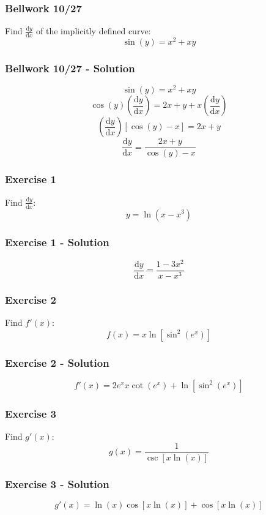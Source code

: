 \documentclass[12pt]{beamer}
\begin{document}
\begin{frame}
	\frametitle{Bellwork 10/27}
	\initclock

	\vfill
	\vfill
	\vfill
	\vfill
	\Large
	Find $\frac{\mathrm{d}y}{\mathrm{d}x}$ of the implicitly defined curve:
	\[\sin\left(y\right)=x^2+xy\]
	\vfill
	\vfill
	\vfill
	\vfill
	\vfill
	\vfill
	\vfill

	\small
	\crono
\end{frame}
\begin{frame}
	\frametitle{Bellwork 10/27 - Solution}

	\large
	\[\sin\left(y\right)=x^2+xy\]
	\[\cos(y)\left(\frac{\mathrm{d}y}{\mathrm{d}x}\right)=2x+y+x\left(\frac{\mathrm{d}y}{\mathrm{d}x}\right)\]
	\[\left(\frac{\mathrm{d}y}{\mathrm{d}x}\right)[\cos(y)-x]=2x+y\]
	\[\boxed{\frac{\mathrm{d}y}{\mathrm{d}x}=\frac{2x+y}{\cos(y)-x}}\]
\end{frame}
\begin{frame}
	\frametitle{Exercise 1}

	\Large
	Find $\frac{\mathrm{d}y}{\mathrm{d}x}$:
	\[y=\ln(x-x^3)\]
\end{frame}
\begin{frame}
	\frametitle{Exercise 1 - Solution}

	\Large
	\[\boxed{\frac{\mathrm{d}y}{\mathrm{d}x}=\frac{1-3x^2}{x-x^3}}\]
\end{frame}
\begin{frame}
	\frametitle{Exercise 2}

	\Large
	Find $f'(x)$:
	\[f(x)=x\ln\left[\sin^{2}\left(e^x\right)\right]\]
\end{frame}
\begin{frame}
	\frametitle{Exercise 2 - Solution}

	\Large
	\[\boxed{f'(x)=2e^xx\cot(e^x)+\ln[\sin^2(e^x)]}\]
\end{frame}
\begin{frame}
	\frametitle{Exercise 3}

	\Large
	Find $g'(x)$:
	\[g(x)=\frac{1}{\csc\left[x\ln\left(x\right)\right]}\]
\end{frame}
\begin{frame}
	\frametitle{Exercise 3 - Solution}

	\Large
	\[\boxed{g'(x)=\ln(x)\cos[x\ln(x)]+\cos[x\ln(x)]}\]
\end{frame}
\end{document}
